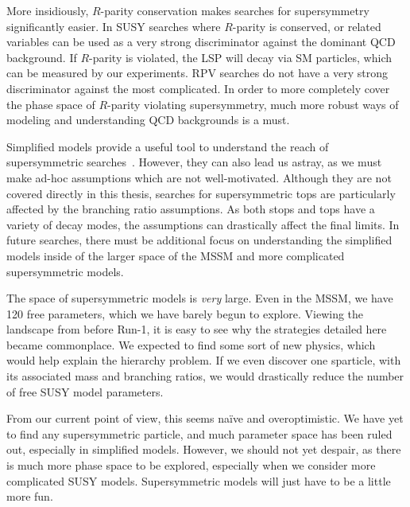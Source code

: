 More insidiously, $R$-parity conservation makes searches for supersymmetry significantly easier.
In SUSY searches where $R$-parity is conserved, \met or related variables can be used as a very strong discriminator against the dominant QCD background.
If $R$-parity is violated, the LSP will decay via SM particles, which can be measured by our experiments.
RPV searches do not have a very strong discriminator against the most complicated.
In order to more completely cover the phase space of $R$-parity violating supersymmetry, much more robust ways of modeling and understanding QCD backgrounds is a must.

Simplified models provide a useful tool to understand the reach of supersymmetric searches~\cite{whitePresusy}.
However, they can also lead us astray, as we must make ad-hoc assumptions which are not well-motivated.
Although they are not covered directly in this thesis, searches for supersymmetric tops are particularly affected by the branching ratio assumptions.
As both stops and tops have a variety of decay modes, the assumptions can drastically affect the final limits.
In future searches, there must be additional focus on understanding the simplified models inside of the larger space of the MSSM and more complicated supersymmetric models.

The space of supersymmetric models is \textit{very} large.
Even in the MSSM, we have 120 free parameters, which we have barely begun to explore.
Viewing the landscape from before Run-1, it is easy to see why the strategies detailed here became commonplace.
We expected to find some sort of new physics, which would help explain the hierarchy problem.
If we even discover one sparticle, with its associated mass and branching ratios, we would drastically reduce the number of free SUSY model parameters.

From our current point of view, this seems na{\"i}ve and overoptimistic.
We have yet to find any supersymmetric particle, and much parameter space has been ruled out, especially in simplified models.
However, we should not yet despair, as there is much more phase space to be explored, especially when we consider more complicated SUSY models.
Supersymmetric models will just have to be a little more fun.